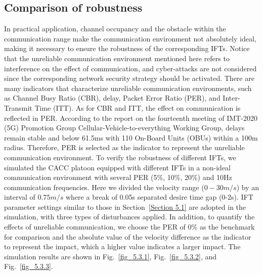 \documentclass[journal]{IEEEtran}
\begin{document}
\subsection{Comparison of robustness}
\label{Section 5.3}
In practical application, channel occupancy and the obstacle within the communication range make the communication environment not absolutely ideal, making it necessary to ensure the robustness of the corresponding IFTs. Notice that the unreliable communication environment mentioned here refers to interference on the effect of communication, and cyber-attacks are not considered since the corresponding network security strategy should be activated. There are many indicators that characterize unreliable communication environments, such as Channel Busy Ratio (CBR), delay, Packet Error Ratio (PER), and Inter-Transmit Time (ITT). As for CBR and ITT, the effect on communication is reflected in PER. According to the report on the fourteenth meeting of IMT-2020 (5G) Promotion Group Cellular-Vehicle-to-everything Working Group, delays remain stable and below 61.5ms with 110 On-Board Units (OBUs) within a 100m radius. Therefore, PER is selected as the indicator to represent the unreliable communication environment. To verify the robustness of different IFTs, we simulated the CACC platoon equipped with different IFTs in a non-ideal communication environment with several PER (5\%, 10\%, 20\%) and 10Hz communication frequencies. Here we divided the velocity range ($0-30 m/s$) by an interval of $0.75 m/s$ where a break of 0.05s separated desire time gap (0-2s). IFT parameter settings similar to those in Section~\ref{Section 5.1} are adopted in the simulation, with three types of disturbances applied. In addition, to quantify the effects of unreliable communication, we choose the PER of 0\% as the benchmark for comparison and the absolute value of the velocity difference as the indicator to represent the impact, which a higher value indicates a larger impact. The simulation results are shown in Fig.~\ref{fig_5.3.1}, Fig.~\ref{fig_5.3.2}, and Fig.~\ref{fig_5.3.3}.
\end{document}
